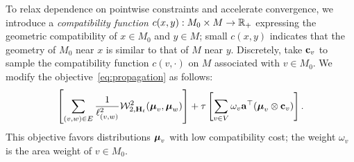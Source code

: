 To relax dependence on pointwise constraints and accelerate convergence, we introduce a \emph{compatibility function} $c(x,y):M_0\times M\rightarrow \mathbb{R}_+$ expressing the geometric compatibility of $x\in M_0$ and $y\in M$; small $c(x,y)$ indicates that the geometry of $M_0$ near $x$ is similar to that of $M$ near $y$.  Discretely, take $\mathbf c_v$ to sample the compatibility function $c(v,\cdot)$ on $M$ associated with $v\in M_0$.  We modify the objective~\eqref{eq:propagation} as follows:
\begin{equation}\label{eq:descriptor_energy}
\left[\sum_{(v,w)\in E} \frac{1}{\ell_{(v,w)}^2} \mathcal W^2_{2,\mathbf{H}_t}(\boldsymbol{\mu}_v,\boldsymbol{\mu}_w)\right]+\tau\left[\sum_{v\in V}\omega_v\mathbf a^\top(\boldsymbol{\mu}_v\otimes \mathbf c_v)\right].
\end{equation}
This objective favors distributions $\boldsymbol{\mu}_v$ with low compatibility cost; the weight $\omega_v$ is the area weight of $v\in M_0$.


